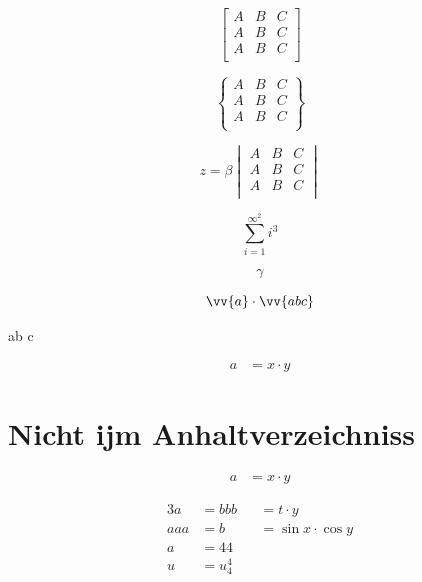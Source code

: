 \documentclass[ngerman,12pt]{scrreprt}
\begin{document}
\begin{equation}
\begin{bmatrix}
A & B & C \\
A & B & C \\
A & B & C \\
\end{bmatrix}
\end{equation}

\begin{equation}
\begin{Bmatrix}
A & B & C \\
A & B & C \\
A & B & C \\
\end{Bmatrix}
\end{equation}

\begin{equation}
z = \beta 
\begin{vmatrix}
A & B & C \\
A & B & C \\
A & B & C \\
\end{vmatrix}
\end{equation}

\begin{equation}
\sum_{i=1}^{\infty^2} i^3
\end{equation}


 \[
 \gamma
 \]

\[ \vv{a} \cdot \vv{abc} \]


a\quad b c


\begin{align}
a &= x \cdot y
\end{align}


\section*{Nicht ijm Anhaltverzeichniss}
\begin{align*}
a &= x \cdot y
\end{align*}

\begin{alignat}{3}
a &= bbb &&= t \cdot y \\
aaa &= b &&= \sin x \cdot \cos y \\
a &= 44 \\
u &= u_{4}^4
\end{alignat}
\end{document}
